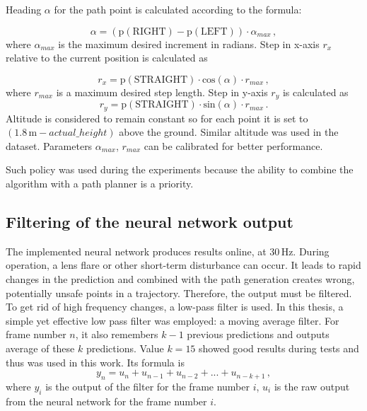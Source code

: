 Heading $\alpha$ for the path point is calculated according to the formula:

\begin{equation}
	\alpha = (\textrm{p}(\textrm{RIGHT}) - \textrm{p}(\textrm{LEFT}))\cdot \alpha_{max}\,,
\end{equation}
where $\alpha_{max}$ is the maximum desired increment in radians. Step in x-axis $r_x$ relative to the current position is calculated as

\begin{equation}
	r_x = \textrm{p}(\textrm{STRAIGHT})\cdot \textrm{cos}(\alpha)\cdot r_{max}\,,
\end{equation}
where $r_{max}$ is a maximum desired step length. Step in y-axis $r_y$ is calculated as
\begin{equation}
	r_y = \textrm{p}(\textrm{STRAIGHT})\cdot \textrm{sin}(\alpha)\cdot r_{max}\,.
\end{equation}
Altitude is considered to remain constant so for each point it is set to $(1.8\,\textrm{m} - actual\_height)$ above the ground. Similar altitude was used in the dataset. Parameters $\alpha_{max}$, $r_{max}$ can be calibrated for better performance.

Such policy was used during the experiments because the ability to combine the algorithm with a path planner is a priority.

\subsection{Filtering of the neural network output}

The implemented neural network produces results online, at 30\,Hz. During operation, a lens flare or other short-term disturbance can occur. It leads to rapid changes in the prediction and combined with the path generation creates wrong, potentially unsafe points in a trajectory. Therefore, the output must be filtered. To get rid of high frequency changes, a low-pass filter is used. In this thesis, a simple yet effective low pass filter was employed: a moving average filter. For frame number $n$, it also remembers $k-1$ previous predictions and outputs average of these $k$ predictions. Value $k=15$ showed good results during tests and thus was used in this work. Its formula is
\begin{equation}
	y_n = u_n + u_{n-1} + u_{n-2} + ... + u_{n-k+1}\,,
\end{equation}
where $y_i$ is the output of the filter for the frame number $i$, $u_i$ is the raw output from the neural network for the frame number $i$.



